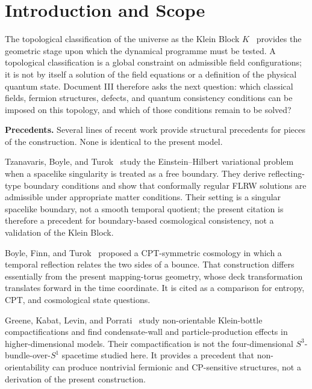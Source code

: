 \documentclass[11pt]{article}
\theoremstyle{canonmath}
\theoremstyle{canonpostulate}
\theoremstyle{canonclaim}
\providecommand{\Klein}{\mathcal{K}}
\providecommand{\Sone}{S^1}
\providecommand{\Sthree}{S^3}
\def\mathcal#1{#1}%
\begin{document}
\newpage
{}
\tableofcontents
\newpage
{}
\setcounter{page}{1}

\section{Introduction and Scope}
\label{sec:intro}

The topological classification of the universe as the Klein Block $\Klein$~\cite{CanonWhat} provides the geometric stage upon which the dynamical programme must be tested. A topological classification is a global constraint on admissible field configurations; it is not by itself a solution of the field equations or a definition of the physical quantum state. Document III therefore asks the next question: which classical fields, fermion structures, defects, and quantum consistency conditions can be imposed on this topology, and which of those conditions remain to be solved?

\textbf{Precedents.} Several lines of recent work provide structural precedents for pieces of the construction. None is identical to the present model.

Tzanavaris, Boyle, and Turok~\cite{Turok2026} study the Einstein--Hilbert variational problem when a spacelike singularity is treated as a free boundary. They derive reflecting-type boundary conditions and show that conformally regular FLRW solutions are admissible under appropriate matter conditions. Their setting is a singular spacelike boundary, not a smooth temporal quotient; the present citation is therefore a precedent for boundary-based cosmological consistency, not a validation of the Klein Block.

Boyle, Finn, and Turok~\cite{BoyleFinnTurok} proposed a CPT-symmetric cosmology in which a temporal reflection relates the two sides of a bounce. That construction differs essentially from the present mapping-torus geometry, whose deck transformation translates forward in the time coordinate. It is cited as a comparison for entropy, CPT, and cosmological state questions.

Greene, Kabat, Levin, and Porrati~\cite{Greene2026,GreeneCompact} study non-orientable Klein-bottle compactifications and find condensate-wall and particle-production effects in higher-dimensional models. Their compactification is not the four-dimensional $\Sthree$-bundle-over-$\Sone$ spacetime studied here. It provides a precedent that non-orientability can produce nontrivial fermionic and CP-sensitive structures, not a derivation of the present construction.
\end{document}
